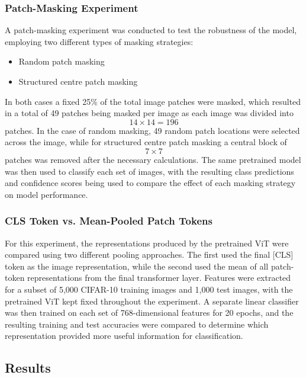 \documentclass{article}
\begin{document}
\subsubsection{Patch-Masking Experiment}
A patch-masking experiment was conducted to test the robustness of the model, employing two different types of masking strategies:

\begin{itemize}
    \item Random patch masking
    \item Structured centre patch masking

\end{itemize}

In both cases a fixed 25\% of the total image patches were masked, which resulted in a total of 49 patches being masked per image as each image was divided into \[14 \times 14 = 196\] patches. In the case of random masking, 49 random patch locations were selected across the image, while for structured centre patch masking a central block of \[7 \times 7\] patches was removed after the necessary calculations. The same pretrained model was then used to classify each set of images, with the resulting class predictions and confidence scores being used to compare the effect of each masking strategy on model performance.



\subsubsection{CLS Token vs. Mean-Pooled Patch Tokens}
For this experiment, the representations produced by the pretrained ViT were compared using two different pooling approaches. The first used the final [CLS] token as the image representation, while the second used the mean of all patch-token representations from the final transformer layer.  Features were extracted for a subset of 5,000 CIFAR-10 training images and 1,000 test images, with the pretrained ViT kept fixed throughout the experiment. A separate linear classifier was then trained on each set of 768-dimensional features for 20 epochs, and the resulting training and test accuracies were compared to determine which representation provided more useful information for classification.


\subsection{Results}
\end{document}
